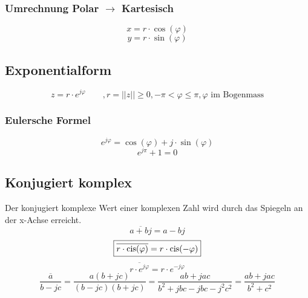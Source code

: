 \subsubsection{Umrechnung Polar $\rightarrow$ Kartesisch}
\[ \boxed{x = r \cdot \cos(\varphi)} \]
\[ \boxed{y = r \cdot \sin(\varphi)} \]
\newpage

\subsection{Exponentialform}
\[ \boxed{z = r \cdot e^{j \varphi} \qquad , r = ||z|| \geq 0
, -\pi < \varphi \leq \pi, \varphi\text{ im Bogenmass}} \]

\subsubsection{Eulersche Formel}
\[ \boxed{e^{j \varphi} = \cos(\varphi) + j \cdot \sin(\varphi)} \]
\[ \boxed{e^{j \pi} + 1 = 0} \]

\subsection{Konjugiert komplex}
Der konjugiert komplexe Wert einer komplexen Zahl wird durch das Spiegeln an 
der x-Achse erreicht. 
\[ \boxed{\overline{a + b j} = a - b j} \]
\[ \boxed{\overline{r \cdot \operatorname{cis}(\varphi)} = r \cdot \operatorname{cis}(-\varphi)} \]
\[ \boxed{\overline{r \cdot e^{j \varphi}} = r \cdot e^{-j \varphi}} \]
\[ \boxed{\overline{\frac{a}{b-jc}} = \frac{a(b+jc)}{(b-jc)(b+jc)} = \frac{ab+jac}{b^2+jbc-jbc-j^2c^2} = \frac{ab+jac}{b^2+c^2} } \]
\begin{figure}[h!]
\centering
{}
\end{figure}
\newpage

